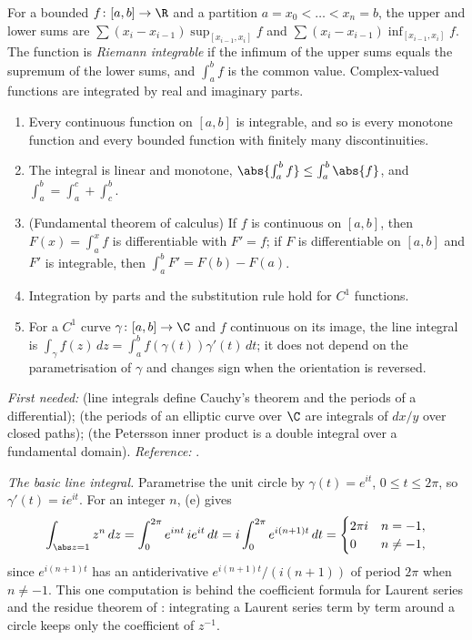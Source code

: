 \begin{definition}\label{def:prereq:riemann}
For a bounded $f\colon[a,b]\to\R$ and a partition $a=x_0<\dots<x_n=b$, the upper and lower sums are
$\sum(x_i-x_{i-1})\sup_{[x_{i-1},x_i]}f$ and $\sum(x_i-x_{i-1})\inf_{[x_{i-1},x_i]}f$. The function
is \emph{Riemann integrable} if the infimum of the upper sums equals the supremum of the lower sums,
and $\int_a^bf$ is the common value. Complex-valued functions are integrated by real and imaginary
parts.
\end{definition}

\begin{theorem}\label{thm:prereq:riemann}
\begin{enumerate}[label=(\alph*)]
\item Every continuous function on $[a,b]$ is integrable, and so is every monotone function and
every bounded function with finitely many discontinuities.
\item The integral is linear and monotone, $\abs{\int_a^bf}\le\int_a^b\abs{f}$, and
$\int_a^b=\int_a^c+\int_c^b$.
\item (Fundamental theorem of calculus) If $f$ is continuous on $[a,b]$, then $F(x)=\int_a^xf$ is
differentiable with $F'=f$; if $F$ is differentiable on $[a,b]$ and $F'$ is integrable, then
$\int_a^bF'=F(b)-F(a)$.
\item Integration by parts and the substitution rule hold for $C^1$ functions.
\item For a $C^1$ curve $\gamma\colon[a,b]\to\C$ and $f$ continuous on its image, the line integral
is $\int_\gamma f(z)\,dz=\int_a^bf(\gamma(t))\gamma'(t)\,dt$; it does not depend on the
parametrisation of $\gamma$ and changes sign when the orientation is reversed.
\end{enumerate}
\end{theorem}
\noindent\emph{First needed:}  (line integrals define Cauchy's theorem and the
periods of a differential);  (the periods of an elliptic curve over $\C$ are
integrals of $dx/y$ over closed paths);  (the Petersson inner product is a double
integral over a fundamental domain). \emph{Reference:} \cite[Chapter 6, Theorems 6.8, 6.20 and
6.21]{Rudin76}.

\emph{The basic line integral.} Parametrise the unit circle by $\gamma(t)=e^{it}$, $0\le t\le2\pi$,
so $\gamma'(t)=ie^{it}$. For an integer $n$, (e) gives
\[
\int_{\abs z=1}z^n\,dz=\int_0^{2\pi}e^{int}\,ie^{it}\,dt=i\int_0^{2\pi}e^{i(n+1)t}\,dt
=\begin{cases}2\pi i&n=-1,\\0&n\ne-1,\end{cases}
\]
since $e^{i(n+1)t}$ has an antiderivative $e^{i(n+1)t}/(i(n+1))$ of period $2\pi$ when $n\ne-1$.
This one computation is behind the coefficient formula for Laurent series and the residue theorem
of : integrating a Laurent series term by term around a circle keeps only
the coefficient of $z^{-1}$.

